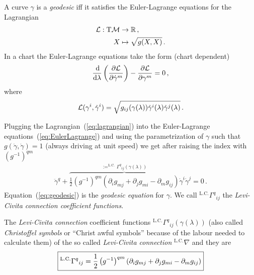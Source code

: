 \begin{theorem}
    A curve $\gamma$ is a \textit{geodesic} iff it satisfies the Euler-Lagrange equations for
    the Lagrangian
    \begin{align}
        \calL: \T \M &\to \mathbb{R}\,,\\
        X &\mapsto \sqrt{g(X,X)}\,.
    \end{align}
    In a chart the Euler-Lagrange equations take the form (chart dependent)
    \begin{equation}
        \frac{\operatorname{d\!}}{\operatorname{d\!} \lambda}\left( \frac{\partial \mathcal{L}}{\partial \dot{\gamma}^m} \right) -
        \frac{\partial \mathcal{L}}{\partial \gamma^m} = 0\,,
        \label{eq:EulerLagrange}
    \end{equation}
    where
    \begin{equation}
        \mathcal{L}(\gamma^i, \dot{\gamma}^i) = \sqrt{g_{ij}(\gamma (\lambda)) \dot{\gamma}^i(\lambda)
            \dot{\gamma}^j(\lambda)}\,.
            \label{eq:lagrangian}
    \end{equation}
\end{theorem}
Plugging the Lagrangian~(\ref{eq:lagrangian}) into the Euler-Lagrange equations~(\ref{eq:EulerLagrange})
and using the parametrization of $\gamma$ such that $g(\dot\gamma, \dot\gamma)=1$
(always driving at unit speed) we get after raising the index with $(g^{-1})^{qm}$
\begin{align}
    \ddot{\gamma}^q + 
    \overbrace{\frac{1}{2}\left( g^{-1} \right)^{qm} \left( \partial_i g_{mj} + \partial_j g_{mi}
    - \partial_m g_{ij} \right)}^{:= ^\text{L.C.}\Gamma^q{}_{ij}(\gamma(\lambda))} \dot{\gamma}^i \dot{\gamma}^j = 0\,.
    \label{eq:geodesic}
\end{align}
Equation~(\ref{eq:geodesic}) is the \textit{geodesic equation} for $\gamma$.
We call $^\text{L.C.}\Gamma^q{}_{ij}$ the \textit{Levi-Civita connection coefficient functions}.
\begin{defn}
    The \textit{Levi-Civita connection} coefficient functions $^\text{L.C.}\Gamma^q{}_{ij}(\gamma(\lambda))$
    (also called \textit{Christoffel symbols} or ``Christ awful symbols'' because of the labour needed 
    to calculate them)
    of the so called \textit{Levi-Civita connection} $^\text{L.C.}\nabla$ and they are
    \begin{equation}
        \boxed{%
        ^\text{L.C.}\Gamma^q{}_{ij} = 
        \frac{1}{2}\left( g^{-1} \right)^{qm} \left( \partial_i g_{mj} + \partial_j g_{mi}
        - \partial_m g_{ij} \right)
    }
    \end{equation}
\end{defn}

